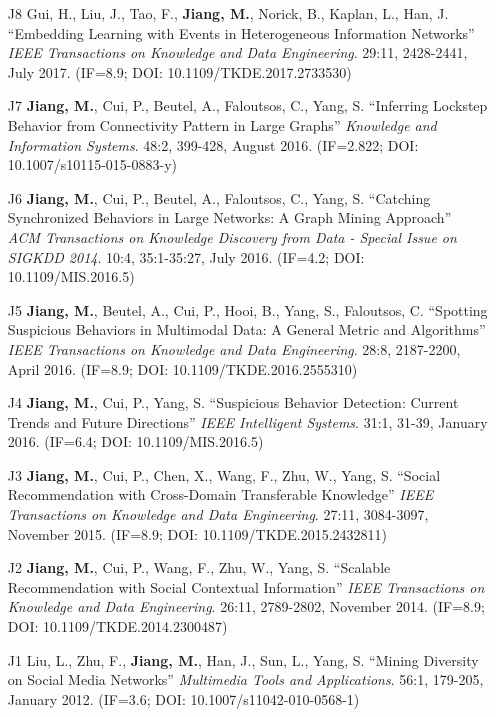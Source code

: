\documentclass[10pt]{article}
\newenvironment{myindentpar}[1]%
{\begin{list}{}%
         {\setlength{\leftmargin}{#1}}%
         \item[]%
}
{\end{list}}
\newcounter{list}
\begin{document}
\begin{myindentpar}{0.00cm}
\begin{enumerate}[leftmargin=.5cm]
\item[J8] Gui, H., Liu, J., Tao, F., \textbf{Jiang, M.}, Norick, B., Kaplan, L., Han, J. ``Embedding Learning with Events in Heterogeneous Information Networks'' \textit{IEEE Transactions on Knowledge and Data Engineering}. 29:11, 2428-2441, July 2017. (IF=8.9; DOI: 10.1109/TKDE.2017.2733530)

\item[J7] \textbf{Jiang, M.}, Cui, P., Beutel, A., Faloutsos, C., Yang, S. ``Inferring Lockstep Behavior from Connectivity Pattern in Large Graphs'' \textit{Knowledge and Information Systems}. 48:2, 399-428, August 2016. (IF=2.822; DOI: 10.1007/s10115-015-0883-y)

\item[J6] \textbf{Jiang, M.}, Cui, P., Beutel, A., Faloutsos, C., Yang, S. ``Catching Synchronized Behaviors in Large Networks: A Graph Mining Approach'' \textit{ACM Transactions on Knowledge Discovery from Data - Special Issue on SIGKDD 2014}. 10:4, 35:1-35:27, July 2016. (IF=4.2; DOI: 10.1109/MIS.2016.5)

\item[J5] \textbf{Jiang, M.}, Beutel, A., Cui, P., Hooi, B., Yang, S., Faloutsos, C. ``Spotting Suspicious Behaviors in Multimodal Data: A General Metric and Algorithms'' \textit{IEEE Transactions on Knowledge and Data Engineering}. 28:8, 2187-2200, April 2016. (IF=8.9; DOI: 10.1109/TKDE.2016.2555310)

\item[J4] \textbf{Jiang, M.}, Cui, P., Yang, S. ``Suspicious Behavior Detection: Current Trends and Future Directions'' \textit{IEEE Intelligent Systems}. 31:1, 31-39, January 2016. (IF=6.4; DOI: 10.1109/MIS.2016.5)

\item[J3] \textbf{Jiang, M.}, Cui, P., Chen, X., Wang, F., Zhu, W., Yang, S. ``Social Recommendation with Cross-Domain Transferable Knowledge'' \textit{IEEE Transactions on Knowledge and Data Engineering}. 27:11, 3084-3097, November 2015. (IF=8.9; DOI: 10.1109/TKDE.2015.2432811)

\item[J2] \textbf{Jiang, M.}, Cui, P., Wang, F., Zhu, W., Yang, S. ``Scalable Recommendation with Social Contextual Information'' \textit{IEEE Transactions on Knowledge and Data Engineering}. 26:11, 2789-2802, November 2014. (IF=8.9; DOI: 10.1109/TKDE.2014.2300487)

\item[J1] Liu, L., Zhu, F., \textbf{Jiang, M.}, Han, J., Sun, L., Yang, S. ``Mining Diversity on Social Media Networks'' \textit{Multimedia Tools and Applications}. 56:1, 179-205, January 2012. (IF=3.6; DOI: 10.1007/s11042-010-0568-1)


\end{enumerate}
\end{myindentpar}
\end{document}
